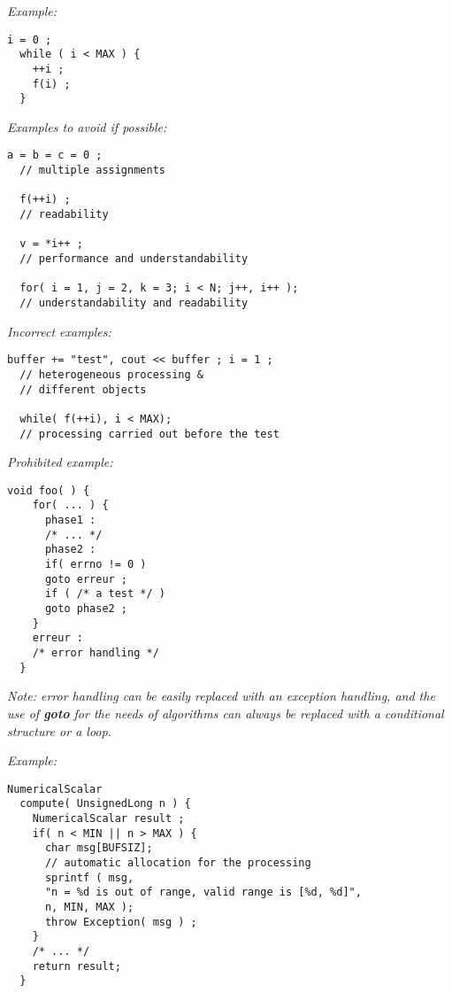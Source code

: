 \emph{Example:}
\lstset{language=C++, basicstyle=\normalsize}
\begin{lstlisting}[frame=TBRL]
  i = 0 ;
  while ( i < MAX ) {
    ++i ;
    f(i) ;
  }
\end{lstlisting}

\emph{Examples to avoid if possible:}
\begin{lstlisting}[frame=TBRL]
  a = b = c = 0 ;
  // multiple assignments

  f(++i) ;
  // readability

  v = *i++ ;
  // performance and understandability

  for( i = 1, j = 2, k = 3; i < N; j++, i++ );
  // understandability and readability
\end{lstlisting}

\emph{Incorrect examples:}
\begin{lstlisting}[frame=TBRL]
  buffer += "test", cout << buffer ; i = 1 ;
  // heterogeneous processing &
  // different objects

  while( f(++i), i < MAX);
  // processing carried out before the test
\end{lstlisting}


\emph{Prohibited example:}
\begin{lstlisting}[frame=TBRL]
  void foo( ) {
    for( ... ) {
      phase1 :
      /* ... */
      phase2 :
      if( errno != 0 )
      goto erreur ;
      if ( /* a test */ )
      goto phase2 ;
    }
    erreur :
    /* error handling */
  }
\end{lstlisting}

\emph{Note: error handling can be easily replaced with an exception handling, and the use of {\bf goto} for the needs of algorithms can always be replaced with a conditional structure or a loop.}

\emph{Example:}
\begin{lstlisting}[frame=TBRL]
  NumericalScalar
  compute( UnsignedLong n ) {
    NumericalScalar result ;
    if( n < MIN || n > MAX ) {
      char msg[BUFSIZ];
      // automatic allocation for the processing
      sprintf ( msg,
      "n = %d is out of range, valid range is [%d, %d]",
      n, MIN, MAX );
      throw Exception( msg ) ;
    }
    /* ... */
    return result;
  }
\end{lstlisting}

